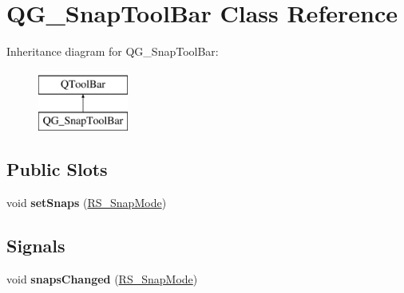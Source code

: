 \hypertarget{classQG__SnapToolBar}{\section{Q\-G\-\_\-\-Snap\-Tool\-Bar Class Reference}
\label{classQG__SnapToolBar}
}
Inheritance diagram for Q\-G\-\_\-\-Snap\-Tool\-Bar\-:\begin{figure}[H]
\begin{center}
\leavevmode
\includegraphics[height=2.000000cm]{classQG__SnapToolBar}
\end{center}
\end{figure}
\subsection*{Public Slots}
\begin{DoxyCompactItemize}
\item 
\hypertarget{classQG__SnapToolBar_ad7f8bbf553e4224f358ec2c7f83908cd}{void {\bfseries set\-Snaps} (\hyperlink{structRS__SnapMode}{R\-S\-\_\-\-Snap\-Mode})}\label{classQG__SnapToolBar_ad7f8bbf553e4224f358ec2c7f83908cd}

\end{DoxyCompactItemize}
\subsection*{Signals}
\begin{DoxyCompactItemize}
\item 
\hypertarget{classQG__SnapToolBar_ad553ac55c8ee860640d0c6e3ad4b4c42}{void {\bfseries snaps\-Changed} (\hyperlink{structRS__SnapMode}{R\-S\-\_\-\-Snap\-Mode})}\label{classQG__SnapToolBar_ad553ac55c8ee860640d0c6e3ad4b4c42}

\end{DoxyCompactItemize}

